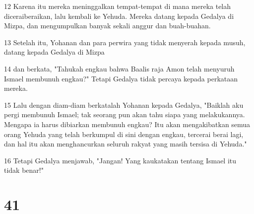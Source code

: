 \par 12 Karena itu mereka meninggalkan tempat-tempat di mana mereka telah diceraiberaikan, lalu kembali ke Yehuda. Mereka datang kepada Gedalya di Mizpa, dan mengumpulkan banyak sekali anggur dan buah-buahan.
\par 13 Setelah itu, Yohanan dan para perwira yang tidak menyerah kepada musuh, datang kepada Gedalya di Mizpa
\par 14 dan berkata, "Tahukah engkau bahwa Baalis raja Amon telah menyuruh Ismael membunuh engkau?" Tetapi Gedalya tidak percaya kepada perkataan mereka.
\par 15 Lalu dengan diam-diam berkatalah Yohanan kepada Gedalya, "Baiklah aku pergi membunuh Ismael; tak seorang pun akan tahu siapa yang melakukannya. Mengapa ia harus dibiarkan membunuh engkau? Itu akan mengakibatkan semua orang Yehuda yang telah berkumpul di sini dengan engkau, tercerai berai lagi, dan hal itu akan menghancurkan seluruh rakyat yang masih tersisa di Yehuda."
\par 16 Tetapi Gedalya menjawab, "Jangan! Yang kaukatakan tentang Ismael itu tidak benar!"

\chapter{41}

